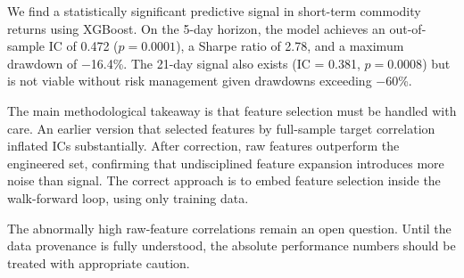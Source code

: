 \documentclass[11pt,a4paper]{article}
\makeatletter
\renewcommand\section{\@startsection{section}{1}{\z@}{-3.5ex \@plus -1ex \@minus -.2ex}{2.3ex \@plus.2ex}{\normalfont\large\bfseries\color{darkblue}}}
\makeatother
\begin{document}
\section{Conclusion}

We find a statistically significant predictive signal in short-term commodity returns using XGBoost. On the 5-day horizon, the model achieves an out-of-sample IC of 0.472 ($p = 0.0001$), a Sharpe ratio of 2.78, and a maximum drawdown of $-$16.4\%. The 21-day signal also exists (IC = 0.381, $p = 0.0008$) but is not viable without risk management given drawdowns exceeding $-$60\%.

The main methodological takeaway is that feature selection must be handled with care. An earlier version that selected features by full-sample target correlation inflated ICs substantially. After correction, raw features outperform the engineered set, confirming that undisciplined feature expansion introduces more noise than signal. The correct approach is to embed feature selection inside the walk-forward loop, using only training data.

The abnormally high raw-feature correlations remain an open question. Until the data provenance is fully understood, the absolute performance numbers should be treated with appropriate caution.
\end{document}
